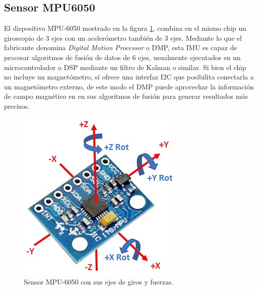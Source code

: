 
\subsection{Sensor MPU6050}

El dispositivo MPU-6050 mostrado en la figura \ref{fig:mpu6050}, combina en el mismo chip un giroscopio de 3 ejes con un acelerómetro también de 3 ejes. Mediante lo que el fabricante denomina \textit{Digital Motion Processor} o DMP, esta IMU es capaz de procesar algoritmos de fusión de datos de 6 ejes, usualmente ejecutados en un microcontrolador o DSP mediante un filtro de Kalman o similar. Si bien el chip no incluye un magnetómetro, sí ofrece una interfaz I2C que posibilita conectarla a un magnetómetro externo, de este modo el DMP puede aprovechar la información de campo magnético en en sus algoritmos de fusión para generar resultados más precisos.
    
\begin{figure}[ht]
    \centering
    \includegraphics[scale=0.5]{./Figures/mpu6050.jpg}
    \caption{Sensor MPU-6050 con sus ejes de giros y fuerzas.}
    \label{fig:mpu6050}
\end{figure}
